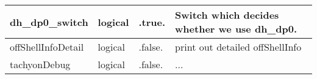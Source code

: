 \documentclass{article}
\begin{document}
\begin{longtable}{llll}
\midrule
dh\_dp0\_switch & \begin{minipage}[t]{2cm}logical\end{minipage} & \begin{minipage}[t]{2cm}.true.\end{minipage} & \begin{minipage}[t]{12cm}Switch which decides whether we use dh\_dp0.\end{minipage}\\*
\midrule
offShellInfoDetail & \begin{minipage}[t]{2cm}logical\end{minipage} & \begin{minipage}[t]{2cm}.false.\end{minipage} & \begin{minipage}[t]{12cm}print out detailed offShellInfo\end{minipage}\\*
\midrule
tachyonDebug & \begin{minipage}[t]{2cm}logical\end{minipage} & \begin{minipage}[t]{2cm}.false.\end{minipage} & \begin{minipage}[t]{12cm}...\end{minipage}\\*
\bottomrule
\end{longtable}
{ }



\end{document}
